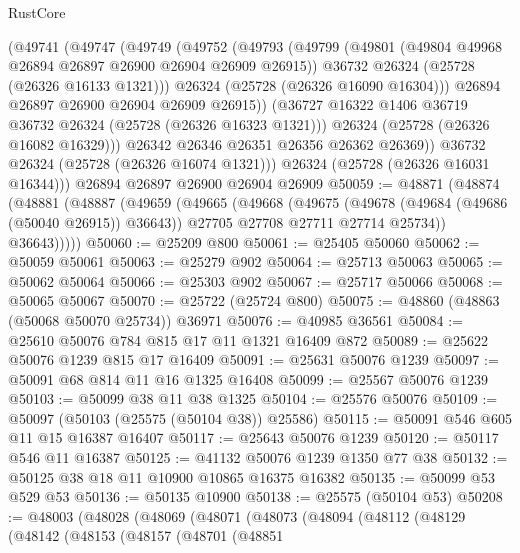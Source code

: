 \begin{lexlean}{RustCore}
\begin{coremodule}
          (@49741
            (@49747
              (@49749
                (@49752
                  (@49793
                    (@49799
                      (@49801 (@49804 @49968 @26894 @26897 @26900 @26904 @26909 @26915))
                      @36732
                      @26324
                      (@25728 (@26326 @16133 @1321)))
                    @26324
                    (@25728 (@26326 @16090 @16304)))
                  @26894
                  @26897
                  @26900
                  @26904
                  @26909
                  @26915))
              (@36727 @16322 @1406 @36719 @36732 @26324 (@25728 (@26326 @16323 @1321)))
              @26324
              (@25728 (@26326 @16082 @16329)))
            @26342
            @26346
            @26351
            @26356
            @26362
            @26369))
        @36732
        @26324
        (@25728 (@26326 @16074 @1321)))
      @26324
      (@25728 (@26326 @16031 @16344)))
    @26894
    @26897
    @26900
    @26904
    @26909
@50059 := @48871
    (@48874
      (@48881
        (@48887
          (@49659
            (@49665
              (@49668
                (@49675
                  (@49678 (@49684 (@49686 (@50040 @26915)) @36643))
                  @27705
                  @27708
                  @27711
                  @27714
                  @25734))
              @36643)))))
@50060 := @25209 @800
@50061 := @25405 @50060
@50062 := @50059 @50061
@50063 := @25279 @902
@50064 := @25713 @50063
@50065 := @50062 @50064
@50066 := @25303 @902
@50067 := @25717 @50066
@50068 := @50065 @50067
@50070 := @25722 (@25724 @800)
@50075 := @48860 (@48863 (@50068 @50070 @25734)) @36971
@50076 := @40985 @36561
@50084 := @25610 @50076 @784 @815 @17 @11 @1321 @16409 @872
@50089 := @25622 @50076 @1239 @815 @17 @16409
@50091 := @25631 @50076 @1239
@50097 := @50091 @68 @814 @11 @16 @1325 @16408
@50099 := @25567 @50076 @1239
@50103 := @50099 @38 @11 @38 @1325
@50104 := @25576 @50076
@50109 := @50097 (@50103 (@25575 (@50104 @38)) @25586)
@50115 := @50091 @546 @605 @11 @15 @16387 @16407
@50117 := @25643 @50076 @1239
@50120 := @50117 @546 @11 @16387
@50125 := @41132 @50076 @1239 @1350 @77 @38
@50132 := @50125 @38 @18 @11 @10900 @10865 @16375 @16382
@50135 := @50099 @53 @529 @53
@50136 := @50135 @10900
@50138 := @25575 (@50104 @53)
@50208 := @48003
    (@48028
      (@48069
        (@48071
          (@48073
            (@48094
              (@48112
                (@48129
                  (@48142
                    (@48153
                      (@48157
                        (@48701
                          (@48851

\end{coremodule}
\end{lexlean}
